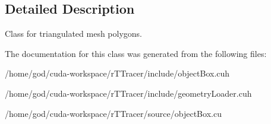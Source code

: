 \subsection{Detailed Description}
Class for triangulated mesh polygons. 

The documentation for this class was generated from the following files\+:\begin{DoxyCompactItemize}
\item 
/home/god/cuda-\/workspace/r\+T\+Tracer/include/object\+Box.\+cuh\item 
/home/god/cuda-\/workspace/r\+T\+Tracer/include/geometry\+Loader.\+cuh\item 
/home/god/cuda-\/workspace/r\+T\+Tracer/source/object\+Box.\+cu\end{DoxyCompactItemize}
